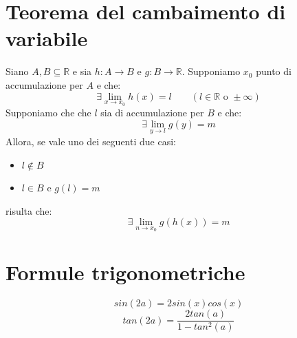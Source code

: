 \documentclass{article}
\begin{document}
    \section{Teorema del cambaimento di variabile}
    Siano $A, B \subseteq \mathbb{R}$ e sia $h:A\to B$ e $g:B\to\mathbb{R}$. Supponiamo $x_0$ punto di accumulazione per $A$ e che:
    \begin{equation}
        \exists\lim_{x\to x_0} h(x) = l \qquad (l\in\mathbb{R} \text{ o } \pm\infty)
    \end{equation}
    Supponiamo che che $l$ sia di accumulazione per $B$ e che:
    \begin{equation}
        \exists\lim_{y\to l}g(y) = m
    \end{equation}
    Allora, se vale uno dei seguenti due casi:
    \begin{itemize}
        \item $l\not\in B$
        \item $l\in B \text{ e } g(l) = m$
    \end{itemize}
    risulta che:
    \begin{equation}
        \exists\lim_{n\to x_0} g(h(x)) = m
    \end{equation}



    \section{Formule trigonometriche}
    \begin{equation}
        sin(2a) = 2sin(x)cos(x)
    \end{equation}
    \begin{equation}
        tan(2a) = \frac{2tan(a)}{1-tan^2(a)}
    \end{equation}

    
    
    
    
    
\end{document}
